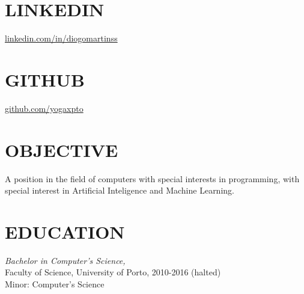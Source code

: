 \documentclass[margin, 10pt]{res} %
\begin{document}
\begin{resume}


    \section{LINKEDIN}

    \href{https://www.linkedin.com/in/diogomartinss}{linkedin.com/in/diogomartinss}


    \section{GITHUB}

    \href{https://github.com/yogaxpto}{github.com/yogaxpto}


    \section{OBJECTIVE}

    A position in the field of computers with special interests in programming, with special interest in Artificial Inteligence and Machine Learning.


    \section{EDUCATION}

     {\sl Bachelor in Computer's Science,} \\
    Faculty of Science, University of Porto, 2010-2016 (halted)  \\
    Minor: Computer's Science



\end{resume}
\end{document}

